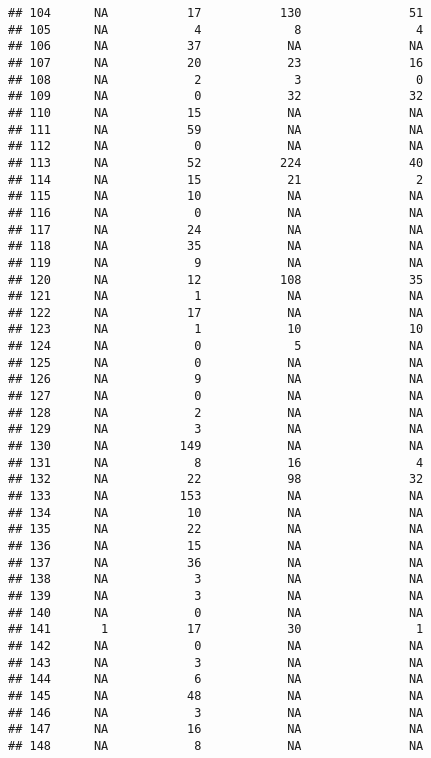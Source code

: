 \documentclass[
  english,
  man]{apa6}
\begin{document}
\begin{verbatim}
## 104      NA           17           130               51
## 105      NA            4             8                4
## 106      NA           37            NA               NA
## 107      NA           20            23               16
## 108      NA            2             3                0
## 109      NA            0            32               32
## 110      NA           15            NA               NA
## 111      NA           59            NA               NA
## 112      NA            0            NA               NA
## 113      NA           52           224               40
## 114      NA           15            21                2
## 115      NA           10            NA               NA
## 116      NA            0            NA               NA
## 117      NA           24            NA               NA
## 118      NA           35            NA               NA
## 119      NA            9            NA               NA
## 120      NA           12           108               35
## 121      NA            1            NA               NA
## 122      NA           17            NA               NA
## 123      NA            1            10               10
## 124      NA            0             5               NA
## 125      NA            0            NA               NA
## 126      NA            9            NA               NA
## 127      NA            0            NA               NA
## 128      NA            2            NA               NA
## 129      NA            3            NA               NA
## 130      NA          149            NA               NA
## 131      NA            8            16                4
## 132      NA           22            98               32
## 133      NA          153            NA               NA
## 134      NA           10            NA               NA
## 135      NA           22            NA               NA
## 136      NA           15            NA               NA
## 137      NA           36            NA               NA
## 138      NA            3            NA               NA
## 139      NA            3            NA               NA
## 140      NA            0            NA               NA
## 141       1           17            30                1
## 142      NA            0            NA               NA
## 143      NA            3            NA               NA
## 144      NA            6            NA               NA
## 145      NA           48            NA               NA
## 146      NA            3            NA               NA
## 147      NA           16            NA               NA
## 148      NA            8            NA               NA

\end{verbatim}
\end{document}
